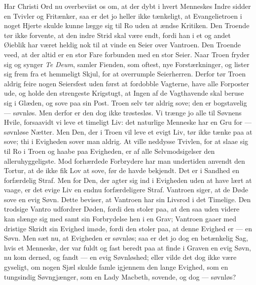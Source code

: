 \documentclass[12pt,a4paper]{book}
\begin{document}
Har Christi Ord nu overbeviist os om, at der dybt i hvert Menneskes Indre sidder en
Tvivler og Fritænker, saa er det jo heller ikke tænkeligt, at Evangelietroen i noget
Hjerte skulde kunne lægge sig til Ro uden at ændse Kritiken. Den Troende tør ikke
forvente, at den indre Strid skal være endt, fordi han i et og andet Øieblik har været
heldig nok til at vinde en Seier over Vantroen. Den Troende veed, at der altid er en
stor Fare forbunden med en stor Seier. Naar Troen fryder sig og synger \textit{Te Deum},
samler Fienden, som oftest, nye Forstærkninger, og lister sig frem fra et hemmeligt
Skjul, for at overrumple Seierherren. Derfor tør Troen aldrig feire nogen Seiersfest
uden først at fordobble Vagterne, have alle Forposter ude, og holde den strengeste
Krigstugt, at Ingen af de Vagthavende skal beruse sig i Glæden, og sove paa sin Post.
Troen selv tør aldrig sove; den er bogstavelig --- søvnløs. Men derfor er den dog ikke
trøstesløs. Vi trænge jo alle til Søvnens Hvile, forsaavidt vi leve et timeligt Liv: det
naturlige Menneske har en Gru for --- søvnløse Nætter. Men Den, der i Troen vil leve et
evigt Liv, tør ikke tænke paa at sove; thi i Evigheden sover man aldrig. At ville
neddysse Tvivlen, for at slaae
sig til Ro i Troen og haabe paa Evigheden, er af alle Selvmodsigelser den
alleruhyggeligste. Mod forhærdede Forbrydere har man undertiden anvendt den Tortur, at
de ikke fik Lov at sove, før de havde bekjendt. Det er i Sandhed en forfærdelig Straf.
Men for Den, der agter sig ind i Evigheden uden at have lært at vaage, er det evige Liv
en endnu forfærdeligere Straf. Vantroen siger, at de Døde sove en evig Søvn. Dette
beviser, at Vantroen har sin Livsrod i det Timelige. Den trodsige Vantro udfordrer Døden,
fordi den stoler paa, at den saa uden videre kan slænge sig med samt sin Forbrydelse hen
i en Grav; Vantroen gaaer med dristige Skridt sin Evighed imøde, fordi den stoler paa,
at denne Evighed er --- en Søvn. Men sæt nu, at Evigheden er søvnløs; saa er det jo dog
en betænkelig Sag, hvis et Menneske, der var fuldt og fast beredt paa at finde i Graven
en evig Søvn, nu kom derned, og fandt --- en evig Søvnløshed; eller vilde det dog ikke
være gyseligt, om nogen Sjæl skulde famle igjennem den lange Evighed, som en tungsindig
Søvngjænger, som en Lady Macbeth, sovende, og dog --- søvnløs?
\end{document}
